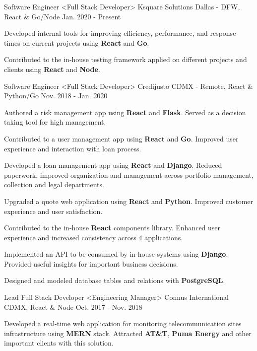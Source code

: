 \begin{cventries}
  \cventry
    {Software Engineer <Full Stack Developer>}
    {Ksquare Solutions}
    {Dallas - DFW, React \& Go/Node}
    {Jan. 2020 - Present}
    {
      \begin{cvitems}
        \item {Developed internal tools for improving efficiency, performance, and response times on current projects using \textbf{React} and \textbf{Go}.}
        \item {Contributed to the in-house testing framework applied on different projects and clients using \textbf{React} and \textbf{Node}.}
      \end{cvitems}
    }
  \cventry
    {Software Engineer <Full Stack Developer>}
    {Credijusto}
    {CDMX - Remote, React \& Python/Go}
    {Nov. 2018 - Jan. 2020}
    {
      \begin{cvitems}
        \item {Authored a risk management app using \textbf{React} and \textbf{Flask}. Served as a decision taking tool for high management.}
        \item {Contributed to a user management app using \textbf{React} and \textbf{Go}. Improved user experience and interaction with loan process.}
        \item {Developed a loan management app using \textbf{React} and \textbf{Django}. Reduced paperwork, improved organization and management across portfolio management, collection and legal departments.}
        \item {Upgraded a quote web application using \textbf{React} and \textbf{Python}. Improved customer experience and user satisfaction.}
        \item {Contributed to the in-house \textbf{React} components library. Enhanced user experience and increased consistency across 4 applications.}
        \item {Implemented an API to be consumed by  in-house systems using \textbf{Django}. Provided useful insights for important business decisions.}
        \item {Designed and modeled database tables and relations with \textbf{PostgreSQL}.}
      \end{cvitems}
    }
  \cventry
    {Lead Full Stack Developer <Engineering Manager>}
    {Connus International}
    {CDMX, React \& Node}
    {Oct. 2017 - Nov. 2018}
    {
      \begin{cvitems}
        \item {Developed a real-time web application for monitoring telecommunication sites infrastructure using \textbf{MERN} stack. Attracted \textbf{AT\&T}, \textbf{Puma Energy} and other important clients with this solution.}

\end{cvitems}}
\end{cventries}
